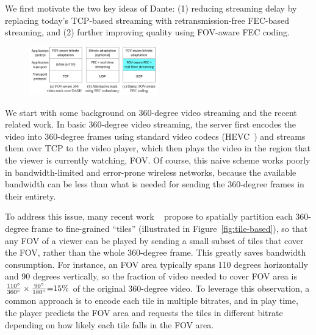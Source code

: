 
We first motivate the two key ideas of Dante:
(1) reducing streaming delay by replacing today's 
TCP-based streaming with retransmission-free FEC-based streaming, and 
(2) further improving quality using FOV-aware FEC coding.


\begin{figure}[t!]
	\centering
	\includegraphics[width=0.5\textwidth]{paper_figs/dante-stack-comparison.pdf}
	\vspace{-0.5cm}
	\label{fig:stack}
\end{figure}

We start with some background on 360-degree video streaming and 
the recent related work. In basic 360-degree video streaming, the 
server first encodes the video into 360-degree frames using standard 
video codecs (\eg HEVC~\cite{HEVC}) and streams them over TCP to the 
video player, which then plays the video in the region that the viewer
is currently watching, \ie FOV. Of course, this 
naive scheme works poorly in bandwidth-limited and error-prone 
wireless networks, because the available bandwidth can be less than 
what is needed for sending the 360-degree frames in their entirety. 


To address this issue, many recent work ~\cite{Viewport-adaptive,360ProbDASH,Adaptive_Streaming_Framework,Two-tier,Omnidirectional_Video_over_HTTP,Furion} propose 
to spatially partition each 360-degree frame to fine-grained 
``tiles'' (illustrated in Figure~\ref{fig:tile-based}), 
so that any FOV
of a viewer can be played by sending 
a small subset of tiles that cover the FOV, rather than the whole 
360-degree frame. This greatly saves bandwidth consumption. For 
instance, an FOV area typically spans 110 degrees horizontally and 
90 degrees vertically, so the fraction of video needed to cover FOV 
area is $\frac{{110^\circ }}{{360^\circ }} \times 
\frac{{90^\circ }}{{180^\circ }}{\rm{ = }}15{\rm{\% }}$ 
of the original 360-degree video. To leverage this observation, a 
common approach is to encode each tile in multiple bitrates, and in 
play time, the player predicts the FOV area and requests the tiles 
in different bitrate depending on how likely each tile falls in the 
FOV area. 

